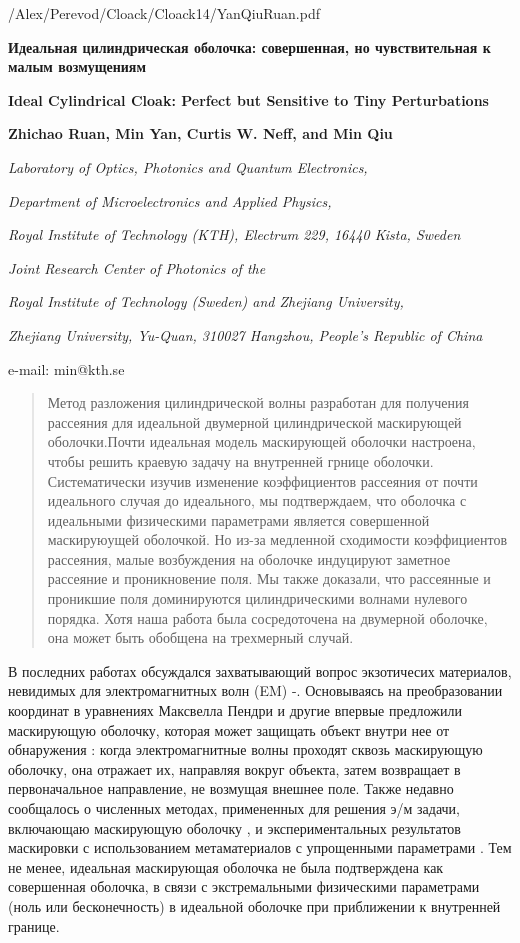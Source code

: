 \documentclass[a4paper, 12pt]{article}
\newcommand{\tit}[1]{\begin{center}{\bf{\Large #1}}\end{center}}
\newcommand{\aut}[1]{\centerline{{\bf #1}}}
\newcommand{\cityorg}[1]{\centerline{\it #1}}
\newcommand{\email}[1]{\centerline{{\small e-mail: #1}}\vspace{\baselineskip}}
\begin{document}
/Alex/Perevod/Cloack/Cloack14/YanQiuRuan.pdf

\sloppy

 \tit{Идеальная цилиндрическая оболочка: совершенная, но чувствительная к малым возмущениям}
 \tit{Ideal Cylindrical Cloak: Perfect but Sensitive to Tiny Perturbations}
 \aut{Zhichao Ruan, Min Yan, Curtis W. Neff, and Min Qiu}
 \cityorg{Laboratory of Optics, Photonics and Quantum Electronics,} 
 \cityorg{Department of Microelectronics and Applied Physics,} 
 \cityorg{Royal Institute of Technology (KTH), Electrum 229, 16440 Kista, Sweden}
 \cityorg{Joint Research Center of Photonics of the}
 \cityorg{Royal Institute of Technology (Sweden) and Zhejiang University,}
 \cityorg{Zhejiang University, Yu-Quan, 310027 Hangzhou, People’s Republic of China}
 \email{min@kth.se}

\begin{abstract}
Метод разложения цилиндрической волны разработан для получения рассеяния для идеальной двумерной цилиндрической
маскирующей оболочки.Почти идеальная модель маскирующей оболочки настроена, чтобы решить краевую задачу на внутренней
грнице оболочки. Систематически изучив изменение коэффициентов рассеяния от почти идеального случая до идеального, мы
подтверждаем, что оболочка с идеальными физическими параметрами является совершенной маскируюущей оболочкой. Но из-за
медленной сходимости коэффициентов рассеяния, малые возбуждения на оболочке индуцируют заметное рассеяние и проникновение
поля. Мы также доказали, что рассеянные и проникшие поля доминируются цилиндрическими волнами нулевого порядка. Хотя
наша работа была сосредоточена на двумерной оболочке, она может быть обобщена на трехмерный случай. 
\end{abstract}

В последних работах обсуждался захватывающий вопрос экзотичесих материалов, невидимых для электромагнитных волн
(EM) \cite{1}-\cite{11}. Основываясь на преобразовании координат в уравнениях Максвелла Пендри и другие впервые
предложили маскирующую оболочку, которая может защищать объект внутри нее от обнаружения \cite{1}: когда 
электромагнитные волны проходят сквозь маскирующую оболочку, она отражает их, направляя вокруг объекта, затем
возвращает в первоначальное направление, не возмущая внешнее поле. Также недавно сообщалось о численных методах,
примененных для решения э/м задачи, включающаю маскирующую оболочку \cite{6,9}, и экспериментальных результатов 
маскировки с использованием метаматериалов с упрощенными параметрами \cite{7}. Тем не менее, идеальная маскирующая 
оболочка не была подтверждена как совершенная оболочка, в связи с экстремальными физическими параметрами (ноль 
или бесконечность) в идеальной оболочке при приближении к внутренней границе.
\end{document}
